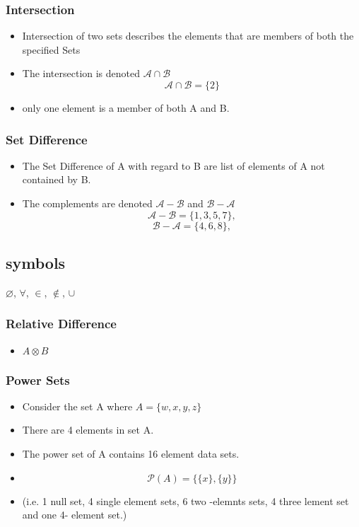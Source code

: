 \documentclass[11pt,a4paper,titlepage,oneside,openany]{article}
\numberwithin{equation}{section}
\numberwithin{algorithm}{section}
\numberwithin{figure}{section}
\numberwithin{table}{section}
\begin{document}
\subsubsection*{Intersection}
\begin{itemize}
\item Intersection of two sets describes the elements that are members of both the specified Sets
\item The intersection is denoted $\mathcal{A\cap B}$
\[ \mathcal{A\cap B} = \{2\}\]
\item only one element is a member of both A and B.
\end{itemize}
\subsubsection*{Set Difference}
\begin{itemize}
\item The Set Difference of A with regard to B are list of elements of A not contained by B.
\item The complements are denoted $\mathcal{A-B}$ and $\mathcal{B-A}$
\[ \mathcal{A-B} = \{1,3,5,7\}, \]
\[ \mathcal{B-A} = \{4,6,8\}, \]
\end{itemize}
\subsection*{symbols}
$\varnothing$,
$\forall$,
$\in$,
$\notin$,
$\cup$
\newpage
\subsubsection*{Relative Difference}
\begin{itemize}
\item $ A \otimes B$
\end{itemize}
\subsubsection*{Power Sets}
\begin{itemize}
\item Consider the set A where $ A = \{w,x,y,z\}$
\item There are 4 elements in set A.
\item The power set of A contains 16 element data sets.
\item \[  \mathcal{P}(A) = \{\{ x \}, \{ y \} \}  \]
\item (i.e. 1 null set, 4 single element sets, 6 two -elemnts sets, 4 three lement set and one 4- element set.)
\end{itemize}
\end{document}

